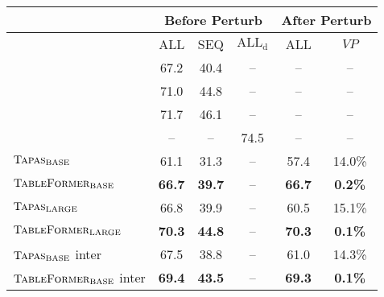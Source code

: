 \documentclass[11pt]{article}
\begin{document}
\begin{table}
\setlength\tabcolsep{4pt}
\scriptsize
\centering
\begin{tabular}{lccc|cc}
\toprule
& \multicolumn{3}{c|}{\bf Before Perturb} & \multicolumn{2}{c}{\bf After Perturb}   \\\midrule
                                             & ALL           & SEQ           & $\text{ALL}_{\text{d}}$ & ALL           & $VP$                                                \\\midrule
\citet{herzig-etal-2020-tapas}                         & 67.2          & 40.4          &       --           &         --      &                                 --                                          \\
\citet{eisenschlos-etal-2020-understanding}                   & 71.0          & 44.8          &           --       &         --      &           --                                                              \\
\citet{eisenschlos2021mate} & 71.7 & 46.1 & -- & -- & --\\
\citet{liu2021tapex}                           &       --        &     --          & 74.5             &      --         &          --                                                                           \\\midrule

$\textsc{Tapas}_{\text{BASE}}$                                  & 61.1          & 31.3          &         --         & 57.4          & 14.0\% \\
$\textsc{TableFormer}_{\text{BASE}}$                             & \textbf{66.7} & \textbf{39.7} &          --        & \textbf{66.7} & \textbf{0.2\%}                                                \\\midrule

$\textsc{Tapas}_{\text{LARGE}}$                                 & 66.8          & 39.9          &         --         & 60.5          & 15.1\%                                                 \\
$\textsc{TableFormer}_{\text{LARGE}}$                           & \textbf{70.3} & \textbf{44.8} &          --        & \textbf{70.3} & \textbf{0.1\%}                                                 \\\midrule

$\textsc{Tapas}_{\text{BASE}}$   inter             & 67.5          & 38.8          &      --            & 61.0          & 14.3\%                                                \\
$\textsc{TableFormer}_{\text{BASE}}$ inter  & \textbf{69.4} & \textbf{43.5} &  --                & \textbf{69.3} & \textbf{0.1\%}                                                \\\midrule


\end{tabular}
\end{table}
\end{document}

